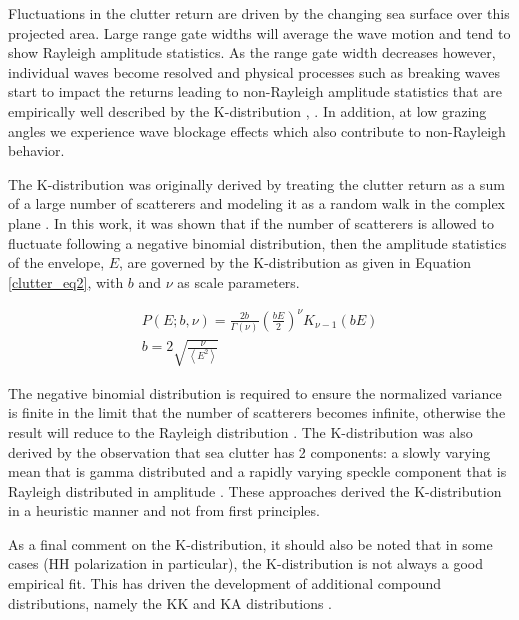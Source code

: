 \documentclass[12pt,twoside]{paper}
\begin{document}
 Fluctuations in the clutter return are driven by the changing sea surface over this projected area. Large range gate widths will average the wave motion and tend to show Rayleigh amplitude statistics. As the range gate width decreases however, individual waves become resolved and physical processes such as breaking waves start to impact the returns leading to non-Rayleigh amplitude statistics that are empirically well described by the K-distribution \cite{ward_sea_clutter}, \cite{crisp_xband}. In addition, at low grazing angles we experience wave blockage effects which also contribute to non-Rayleigh behavior.

The K-distribution was originally derived by treating the clutter return as a sum of a large number of scatterers and modeling it as a random walk in the complex plane \cite{jakeman_model_non_rayleigh}. In this work, it was shown that if the number of scatterers is allowed to fluctuate following a negative binomial distribution, then the amplitude statistics of the envelope, $E$, are governed by the K-distribution as given in Equation \ref{clutter_eq2}, with $b$ and $\nu$ as scale parameters.

\begin{gather}
\label{clutter_eq2}
P(E;b,\nu) = \frac{2b}{\Gamma(\nu)}\left(\frac{bE}{2} \right)^{\nu}K_{\nu-1}(bE)\\
b = 2\sqrt{\frac{\nu}{\left<E^2\right>}}
\end{gather}

The negative binomial distribution is required to ensure the normalized variance is finite in the limit that the number of scatterers becomes infinite, otherwise the result will reduce to the Rayleigh distribution \cite{jakeman_significance}. The K-distribution was also derived by the observation that sea clutter has 2 components: a slowly varying mean that is gamma distributed and a rapidly varying speckle component that is Rayleigh distributed in amplitude \cite{ward_sea_clutter}. These approaches derived the K-distribution in a heuristic manner and not from first principles.

As a final comment on the K-distribution, it should also be noted that in some cases (HH polarization in particular), the K-distribution is not always a good empirical fit. This has driven the development of additional compound distributions, namely the KK and KA distributions \cite{crisp_xband}.
\end{document}
